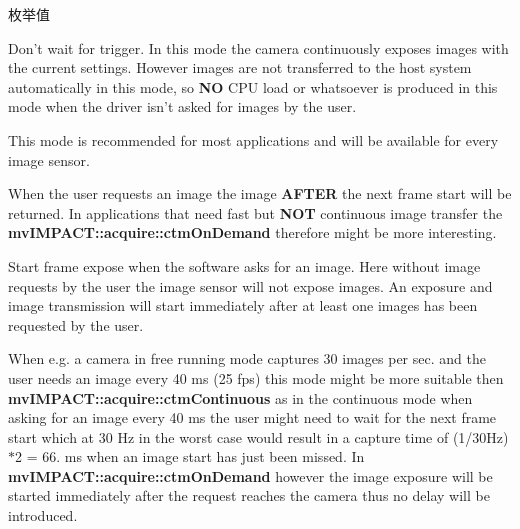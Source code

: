  \begin{Desc}
\item[枚举值]\par
\begin{description}
\item[{\em 
\hypertarget{group___device_specific_interface_gga7d880247a3af52241ce96ba703c526a1a874df7a22c70e15b7d6e49fb851b22ef}{ctm\+Continuous}\label{group___device_specific_interface_gga7d880247a3af52241ce96ba703c526a1a874df7a22c70e15b7d6e49fb851b22ef}
}]Don't wait for trigger. In this mode the camera continuously exposes images with the current settings. However images are not transferred to the host system automatically in this mode, so {\bfseries N\+O} C\+P\+U load or whatsoever is produced in this mode when the driver isn't asked for images by the user.

This mode is recommended for most applications and will be available for every image sensor.

When the user requests an image the image {\bfseries A\+F\+T\+E\+R} the next frame start will be returned. In applications that need fast but {\bfseries N\+O\+T} continuous image transfer the {\bfseries mv\+I\+M\+P\+A\+C\+T\+::acquire\+::ctm\+On\+Demand} therefore might be more interesting. \item[{\em 
\hypertarget{group___device_specific_interface_gga7d880247a3af52241ce96ba703c526a1adf4322d032dc916f683def85b8a4598f}{ctm\+On\+Demand}\label{group___device_specific_interface_gga7d880247a3af52241ce96ba703c526a1adf4322d032dc916f683def85b8a4598f}
}]Start frame expose when the software asks for an image. Here without image requests by the user the image sensor will not expose images. An exposure and image transmission will start immediately after at least one images has been requested by the user.

When e.\+g. a camera in free running mode captures 30 images per sec. and the user needs an image every 40 ms (25 fps) this mode might be more suitable then {\bfseries mv\+I\+M\+P\+A\+C\+T\+::acquire\+::ctm\+Continuous} as in the continuous mode when asking for an image every 40 ms the user might need to wait for the next frame start which at 30 Hz in the worst case would result in a capture time of (1/30\+Hz)$\ast$2 = 66. ms when an image start has just been missed. In {\bfseries mv\+I\+M\+P\+A\+C\+T\+::acquire\+::ctm\+On\+Demand} however the image exposure will be started immediately after the request reaches the camera thus no delay will be introduced.


\end{description}
\end{Desc}
